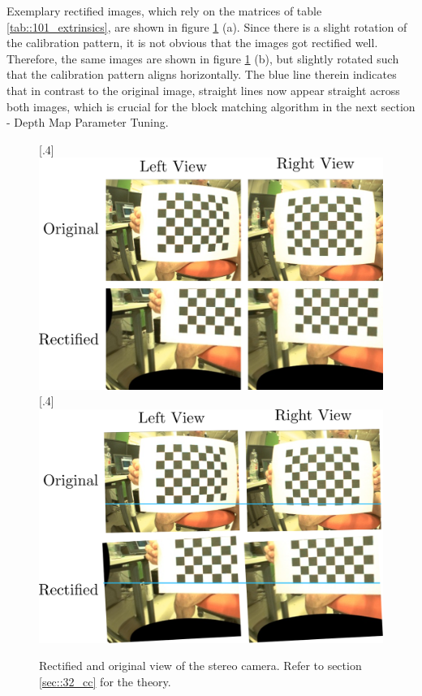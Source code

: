 Exemplary rectified images, which rely on the matrices of table \ref{tab::101_extrinsics}, are shown in figure \ref{fig::101_rect} (a). Since there is a slight rotation of the calibration pattern, it is not obvious that the images got rectified well. Therefore, the same images are shown in figure \ref{fig::101_rect} (b), but slightly rotated such that the calibration pattern aligns horizontally. The blue line therein indicates that in contrast to the original image, straight lines now appear straight across both images, which is crucial for the block matching algorithm in the next section - Depth Map Parameter Tuning.
\begin{figure}[h!]
	\centering
	[.4\linewidth]{\includegraphics[scale=.25]{chapters/10_image_processing_experiments/img/rect.png}}
	[.4\linewidth]{\includegraphics[scale=.25]{chapters/10_image_processing_experiments/img/rect_line.png}}
	\caption{Rectified and original view of the stereo camera. Refer to section \ref{sec::32_cc} for the theory.}
	\label{fig::101_rect}
\end{figure}
\FloatBarrier
